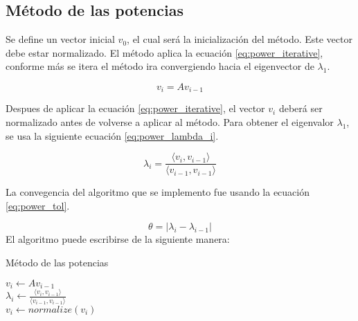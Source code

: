 \subsection{Método de las potencias \label{sec:power}}

Se define un vector inicial $v_0$, el cual será la inicialización del método. Este vector debe estar normalizado. El método aplica la ecuación \ref{eq:power_iterative}, conforme más se itera el método ira convergiendo hacia el eigenvector de $\lambda_1$.

\begin{equation}
    v_i = Av_{i-1} \label{eq:power_iterative}
\end{equation}

Despues de aplicar la ecuación \ref{eq:power_iterative}, el vector $v_i$ deberá ser normalizado antes de volverse a aplicar al método. Para obtener el eigenvalor $\lambda_1$, se usa la siguiente ecuación \ref{eq:power_lambda_i}.

\begin{equation}
    \lambda_i = \frac{\langle v_i , v_{i-1}\rangle}{\langle v_{i-1}, v_{i-1}\rangle} \label{eq:power_lambda_i}
\end{equation}

La convegencia del algoritmo que se implemento fue usando la ecuación \ref{eq:power_tol}.

\begin{equation}
    \theta = |\lambda_i - \lambda_{i-1}| \label{eq:power_tol}
\end{equation}
El algoritmo puede escribirse de la siguiente manera:

\begin{algorithm}[H]
    \caption{Método de las potencias}
    \label{alg:power_method}
    {
        $v_i \gets Av_{i-1}$\\
        $\lambda_i \gets \frac{\langle v_i , v_{i-1}\rangle}{\langle v_{i-1}, v_{i-1}\rangle}$\\
        $v_i \gets normalize(v_i)$\\
    }
\end{algorithm}